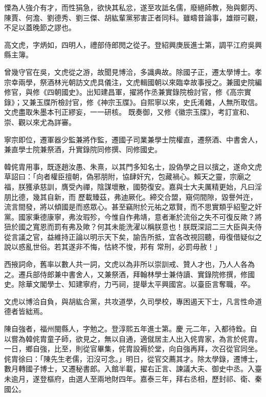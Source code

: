 \begin{pinyinscope}
 慄為人強介有才，而性狷急，欲快其私忿，遂至攻詆名儒，廢絕師教，殆與鄭丙、陳賈、何澹、劉德秀、劉三傑、胡紘輩黨邪害正者同科。雖疇昔論事，雄辯可觀，不足以蓋晚節之謬也。



 高文虎，字炳如，四明人，禮部侍郎閌之從子。登紹興庚辰進士第，調平江府吳興縣主簿。



 曾幾守官在吳，文虎從之游，故聞見博洽，多識典故。除國子正，遷太學博士。孝宗幸兩學，祭酒林光朝訪文虎具儀注，文虎輯國朝以來臨幸故事授之。兼國史院編修官，與修《四朝國史》。出知建昌軍，擢將作丞兼實錄院檢討官，修《高宗實錄》；又兼玉牒所檢討官，修《神宗玉牒》。自熙寧以來，史氏淆雜，人無所取信。文虎盡取朱墨本刊正繆妄，一一研核。
 既奏御，又修《徽宗玉牒》，考訂宣和、崇、觀以來尤為詳審。



 寧宗即位，遷軍器少監兼將作監，遷國子司業兼學士院權直，遷祭酒、中書舍人，兼直學士院兼祭酒，升實錄院同修撰、同修國史。



 韓侂胄用事，既逐趙汝愚、朱熹，以其門多知名士，設偽學之目以擯之，遂命文虎草詔曰：「向者權臣擅朝，偽邪朋附，協肆奸宄，包藏禍心。賴天之靈，宗廟之福，朕獲承慈訓，膺受內禪，陰謀壞散，國勢復安。嘉與士大夫厲精更始，凡曰淫朋比德，幾其自新，而
 歷載臻茲，弗迪厥化。締交合盟，窺伺間隙，毀譽舛迕，流言間發，將以傾國是而惑眾心。甚至竊附於元祐之眾賢，而不思實類乎紹聖之奸黨。國家秉德康寧，弗汝瑕殄，今惟自作弗靖，意者漸於流俗之失不可復反歟？將狃於國之寬恩而罰有弗及歟？何其未能洗濯以稱朕意也！朕既深詔二三大臣與夫侍從言議之官，益維持正論以明示天下矣，諭告所抵，宜各改視回聽，毋復借疑似之說以惑亂世俗。若其遂非不悔，怙終不悛，邦有
 常刑，必罰毋赦！」



 西掖詞命，舊率以數人共一詞，文虎以為非所以崇訓戒、贊人才也，乃人人各為之。遷兵部侍郎兼中書舍人，又兼祭酒，拜翰林學士兼侍讀、實錄院修撰，修國史。除華文閣學士、知建寧府，力丐祠，提舉太平興國宮。以臺臣言奪職，卒。



 文虎以博洽自負，與胡紘合黨，共攻道學，久司學校，專困遏天下士，凡言性命道德者皆絀焉。



 陳自強者，福州閩縣人，字勉之。登淳熙五年進士第。慶
 元二年，入都待銓。自以嘗為韓侂胄童子師，欲見之，無以自通，適僦居主人出入侂胄家，為言於侂胄。一日，鄉自強，比至，則從官畢集，侂胄設褥於堂，向自強再拜，次召從官同坐。侂胄徐曰：「陳先生老儒，汩沒可念。」明日，從官交薦其才。除太學錄，遷博士，數月轉國子博士，又遷秘書郎。入館半載，擢右正言、諫議大夫、御史中丞。入臺未逾月，遂登樞府，由選人至兩地財四年。嘉泰三年，拜右丞相，歷封祁、衛、秦國公。




\end{pinyinscope}
